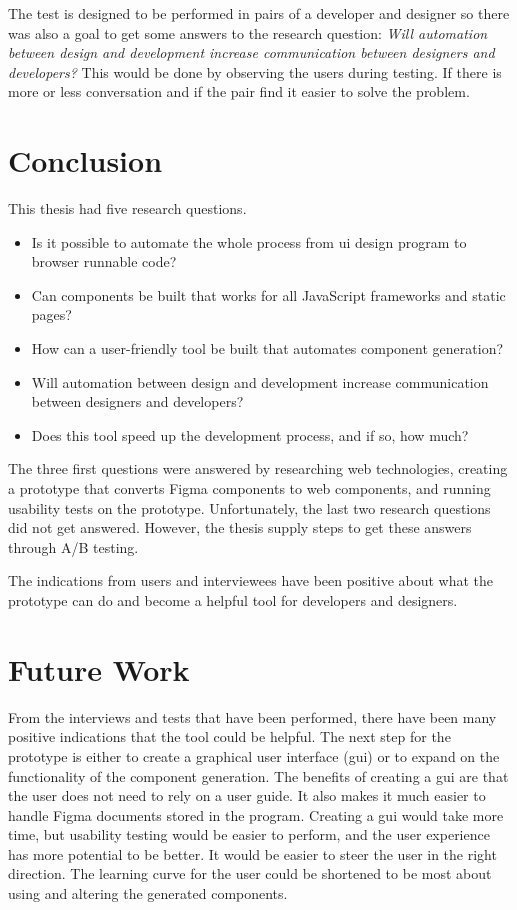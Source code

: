 The test is designed to be performed in pairs of a developer and designer so there was also a goal to get some answers to the research question: \textit{Will automation between design and development increase communication between designers and developers?} This would be done by observing the users during testing. If there is more or less conversation and if the pair find it easier to solve the problem.

\newpage
\section{Conclusion}
\label{sub:conclusion}
This thesis had five research questions.  
\begin{itemize}
  \item Is it possible to automate the whole process from \acrshort{ui} design program to browser runnable code? 
 \item Can components be built that works for all JavaScript frameworks and static pages?
  \item How can a user-friendly tool be built that automates component generation?  
  \item Will automation between design and development increase communication between designers and developers?
  \item Does this tool speed up the development process, and if so, how much? 
\end{itemize}

The three first questions were answered by researching web technologies, creating a prototype that converts Figma components to web components, and running usability tests on the prototype. Unfortunately, the last two research questions did not get answered. However, the thesis supply steps to get these answers through A/B testing. 

The indications from users and interviewees have been positive about what the prototype can do and become a helpful tool for developers and designers. 

\section{Future Work}%
\label{sub:Future Work}

From the interviews and tests that have been performed, there have been many positive indications that the tool could be helpful. The next step for the prototype is either to create a graphical user interface (\acrshort{gui}) or to expand on the functionality of the component generation. The benefits of creating a \acrshort{gui} are that the user does not need to rely on a user guide. It also makes it much easier to handle Figma documents stored in the program. Creating a \acrshort{gui} would take more time, but usability testing would be easier to perform, and the user experience has more potential to be better. It would be easier to steer the user in the right direction. The learning curve for the user could be shortened to be most about using and altering the generated components. 

